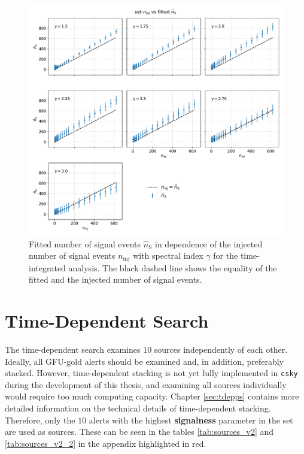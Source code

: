 \begin{figure}
    \centering
    \includegraphics[width=\linewidth]{Plots/05_csky/ns_fit_auto_4.pdf}
    \caption{Fitted number of signal events $\hat{n}_{\text{S}}$ in dependence of the injected number of signal events $n_\text{inj}$ with spectral index $\gamma$ for the time-integrated analysis. The black dashed line shows the equality of the fitted and the injected number of signal events.}
    \label{fig:fit_bias_ns}
\end{figure}

\chapter{Time-Dependent Search} \label{sec:csky_time_dep}

The time-dependent search examines $\num{10}$ sources independently of each other.
Ideally, all GFU-gold alerts should be examined and, in addition, preferably stacked.
However, time-dependent stacking is not yet fully implemented in \texttt{csky} during the development of this thesis, and examining all sources individually would require too much computing capacity.
Chapter \ref{sec:tdepps} contains more detailed information on the technical details of time-dependent stacking.
Therefore, only the $\num{10}$ alerts with the highest \textbf{signalness} parameter in the set are used as sources.
These can be seen in the tables \ref{tab:sources_v2} and \ref{tab:sources_v2_2} in the appendix highlighted in red.

